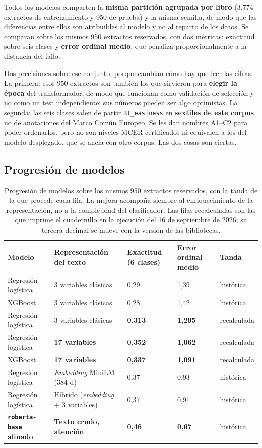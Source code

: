 \documentclass[11pt,a4paper]{article}
\newcommand{\cod}[1]{\texttt{\small #1}}
\begin{document}
Todos los modelos comparten la \textbf{misma partición agrupada por libro} (3.774
extractos de entrenamiento y 950 de prueba) y la misma semilla, de modo que las
diferencias entre ellos son atribuibles al modelo y no al reparto de los datos. Se
comparan sobre los mismos 950 extractos reservados, con dos métricas: exactitud sobre
seis clases y \textbf{error ordinal medio}, que penaliza proporcionalmente a la distancia
del fallo.

Dos precisiones sobre ese conjunto, porque cambian cómo hay que leer las cifras. La
primera: esos 950 extractos son también los que sirvieron para \textbf{elegir la época}
del transformador, de modo que funcionan como validación de selección y no como un test
independiente; sus números pueden ser algo optimistas. La segunda: las seis clases salen
de partir \cod{BT\_easiness} en \textbf{sextiles de este corpus}, no de anotaciones del
Marco Común Europeo. Se les dan nombres A1--C2 para poder ordenarlos, pero no son niveles
MCER certificados ni equivalen a los del modelo desplegado, que se ancla con otro corpus.
Las dos cosas son ciertas.

\subsection{Progresión de modelos}
\label{sec:progresion}

\begin{table}[htbp]
\centering
\small
\setlength{\tabcolsep}{4pt}
\begin{tabular}{@{}l l R{2.1cm} R{2.1cm} l@{}}
\toprule
\textbf{Modelo} & \textbf{Representación del texto} & \textbf{Exactitud (6 clases)} & \textbf{Error ordinal medio} & \textbf{Tanda} \\
\midrule
Regresión logística & 3 variables clásicas & 0,29 & 1,39 & histórica \\
XGBoost & 3 variables clásicas & 0,28 & 1,42 & histórica \\
Regresión logística & 3 variables clásicas & \textbf{0,313} & \textbf{1,295} & recalculada \\
Regresión logística & \textbf{17 variables} & \textbf{0,352} & \textbf{1,062} & recalculada \\
XGBoost & \textbf{17 variables} & \textbf{0,337} & \textbf{1,091} & recalculada \\
Regresión logística & \emph{Embedding} MiniLM (384 d) & 0,37 & 0,93 & histórica \\
Regresión logística & Híbrido (\emph{embedding} + 3 variables) & 0,37 & 0,91 & histórica \\
\textbf{\cod{roberta-base} afinado} & \textbf{Texto crudo, atención} & \textbf{0,46} & \textbf{0,67} & histórica \\
\bottomrule
\end{tabular}
\caption{Progresión de modelos sobre los mismos 950 extractos reservados, con la tanda de
la que procede cada fila. La mejora acompaña siempre al enriquecimiento de la
representación, no a la complejidad del clasificador. Las filas recalculadas son las que
imprime el cuadernillo en la ejecución del 16 de septiembre de 2026; su tercera decimal se
mueve con la versión de las bibliotecas.}
\label{cuad:progresion}
\end{table}
\end{document}
